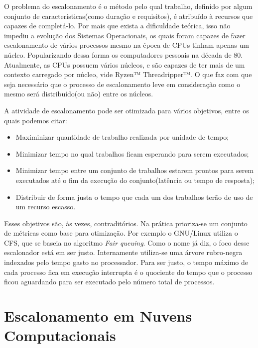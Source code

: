 O problema do escalonamento é o método pelo qual trabalho, definido por algum conjunto de características(como duração e requisitos), é atribuído à recursos que capazes de completá-lo. Por mais que exista a dificuldade teórica\cite{ULLMAN1975384}, isso não impediu a evolução dos Sistemas Operacionais, os quais foram capazes de fazer escalonamento de vários processos mesmo na época de \acrfull{CPU}s tinham apenas um núcleo. Popularizando dessa forma os computadores pessoais na década de 80.
Atualmente, as \acrshort{CPU}s possuem vários núcleos, e são capazes de ter mais de um contexto carregado por núcleo, vide Ryzen™ Threadripper™\cite{Ryzen}. O que faz com que seja necessário que o processo de escalonamento leve em consideração como o mesmo será distribuído(ou não) entre os núcleos.

A atividade de escalonamento pode ser otimizada para vários objetivos, entre os quais podemos citar:
\begin{itemize}
	\item Maximinizar quantidade de trabalho realizada por unidade de tempo;
	\item Minimizar tempo no qual trabalhos ficam esperando para serem executados;
	\item Minimizar tempo entre um conjunto de trabalhos estarem prontos para serem executados até o fim da execução do conjunto(latência ou tempo de resposta);
	\item Distribuir de forma justa o tempo que cada um dos trabalhos terão de uso de um recurso escasso.
\end{itemize}

Esses objetivos são, às vezes, contraditórios. Na prática prioriza-se um conjunto de métricas como base para otimização. Por exemplo o GNU/Linux utiliza o \acrfull{CFS}, que se baseia no algoritmo \textit{Fair queuing}. Como o nome já diz, o foco desse escalonador está em ser justo. Internamente utiliza-se uma árvore rubro-negra indexados pelo tempo gasto no processador. Para ser justo, o tempo máximo de cada processo fica em execução interrupta é o quociente do tempo que o processo ficou aguardando para ser executado pelo número total de processos.

\section{Escalonamento em Nuvens Computacionais}

